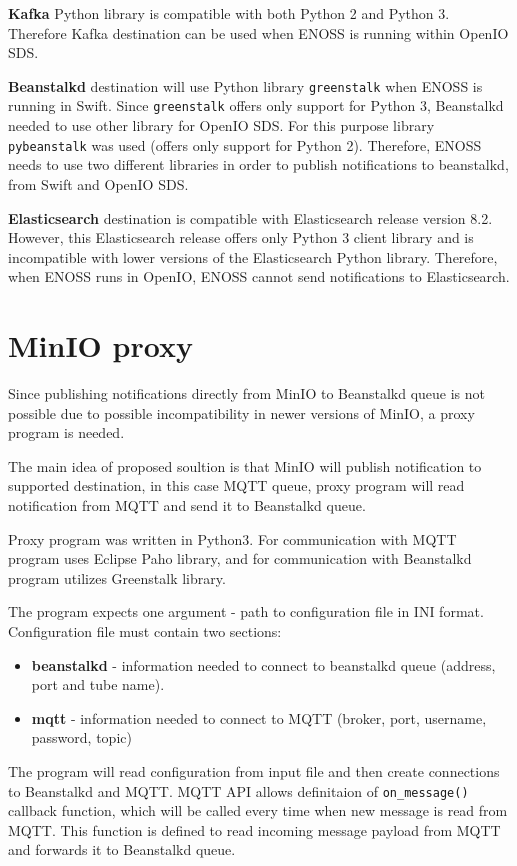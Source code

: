     \textbf{Kafka} Python library is compatible with both Python 2 and Python 3. Therefore Kafka destination can be used when ENOSS is running within OpenIO SDS.

    \textbf{Beanstalkd} destination will use Python library \texttt{greenstalk} when ENOSS is running in Swift. Since \texttt{greenstalk} offers only support for Python 3, Beanstalkd needed to use other library for OpenIO SDS. For this purpose library \texttt{pybeanstalk} was used (offers only support for Python 2). Therefore, ENOSS needs to use two different libraries in order to publish notifications to beanstalkd, from Swift and OpenIO SDS.

    \textbf{Elasticsearch} destination is compatible with Elasticsearch release version 8.2. However, this Elasticsearch release offers only Python 3 client library and is incompatible with lower versions of the Elasticsearch Python library. Therefore, when ENOSS runs in OpenIO, ENOSS cannot send notifications to Elasticsearch.

\section{MinIO proxy}
    Since publishing notifications directly from MinIO to Beanstalkd queue is not possible due to possible incompatibility in newer versions of MinIO, a proxy program is needed.

    The main idea of proposed soultion is that MinIO will publish notification to supported destination, in this case MQTT queue, proxy program will read notification from MQTT and send it to Beanstalkd queue.

    Proxy program was written in Python3. For communication with MQTT program uses Eclipse Paho library, and for communication with Beanstalkd program utilizes Greenstalk library.

    The program expects one argument - path to configuration file in INI format. Configuration file must contain two sections:
    \begin{itemize}
        \item \textbf{beanstalkd} - information needed to connect to beanstalkd queue (address, port and tube name).
        \item \textbf{mqtt} - information needed to connect to MQTT (broker, port, username, password, topic)
    \end{itemize}

    The program will read configuration from input file and then create connections to Beanstalkd and MQTT. MQTT API allows definitaion of \texttt{on\_message()} callback function, which will be called every time when new message is read from MQTT. This function is defined to read incoming message payload from MQTT and forwards it to Beanstalkd queue.

